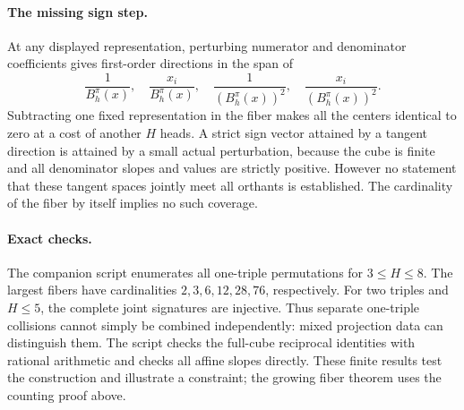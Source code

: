 \documentclass[11pt]{article}
\begin{document}
\paragraph{The missing sign step.}
At any displayed representation, perturbing numerator and denominator
coefficients gives first-order directions in the span of
\[
 \frac{1}{B_h^\pi(x)},\quad
 \frac{x_i}{B_h^\pi(x)},\quad
 \frac{1}{(B_h^\pi(x))^2},\quad
 \frac{x_i}{(B_h^\pi(x))^2}.
\]
Subtracting one fixed representation in the fiber makes all the
centers identical to zero at a cost of another $H$ heads. A strict
sign vector attained by a tangent direction is attained by a small
actual perturbation, because the cube is finite and all denominator
slopes and values are strictly positive. However no statement that
these tangent spaces jointly meet all orthants is established.
The cardinality of the fiber by itself implies no such coverage.

\paragraph{Exact checks.}
The companion script enumerates all one-triple permutations for
$3\leq H\leq8$. The largest fibers have cardinalities
$2,3,6,12,28,76$, respectively. For two triples and $H\leq5$,
the complete joint signatures are injective. Thus separate
one-triple collisions cannot simply be combined independently:
mixed projection data can distinguish them. The script checks
the full-cube reciprocal identities with rational arithmetic
and checks all affine slopes directly. These finite results
test the construction and illustrate a constraint; the growing
fiber theorem uses the counting proof above.
\end{document}
